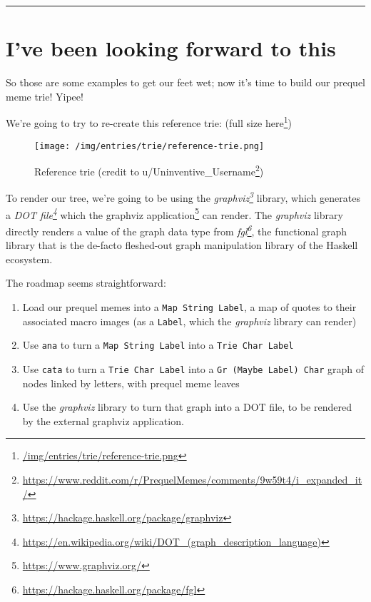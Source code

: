 \documentclass[]{article}
\renewcommand{\href}[2]{#2\footnote{\url{#1}}}
\begin{document}
\begin{center}\rule{0.5\linewidth}{\linethickness}\end{center}

\hypertarget{ive-been-looking-forward-to-this}{%
\section{I've been looking forward to
this}\label{ive-been-looking-forward-to-this}}

So those are some examples to get our feet wet; now it's time to build our
prequel meme trie! Yipee!

We're going to try to re-create this reference trie:
(\href{/img/entries/trie/reference-trie.png}{full size here})

\begin{figure}
\centering
\texttt{[image: /img/entries/trie/reference-trie.png]}
\caption{Reference trie (credit to
\href{https://www.reddit.com/r/PrequelMemes/comments/9w59t4/i_expanded_it/}{u/Uninventive\_Username})}
\end{figure}

To render our tree, we're going to be using the
\emph{\href{https://hackage.haskell.org/package/graphviz}{graphviz}} library,
which generates a
\emph{\href{https://en.wikipedia.org/wiki/DOT_(graph_description_language)}{DOT
file}} which the \href{https://www.graphviz.org/}{graphviz application} can
render. The \emph{graphviz} library directly renders a value of the graph data
type from \emph{\href{https://hackage.haskell.org/package/fgl}{fgl}}, the
functional graph library that is the de-facto fleshed-out graph manipulation
library of the Haskell ecosystem.

The roadmap seems straightforward:

\begin{enumerate}
\def\labelenumi{\arabic{enumi}.}
\tightlist
\item
  Load our prequel memes into a \texttt{Map\ String\ Label}, a map of quotes to
  their associated macro images (as a \texttt{Label}, which the \emph{graphviz}
  library can render)
\item
  Use \texttt{ana} to turn a \texttt{Map\ String\ Label} into a
  \texttt{Trie\ Char\ Label}
\item
  Use \texttt{cata} to turn a \texttt{Trie\ Char\ Label} into a
  \texttt{Gr\ (Maybe\ Label)\ Char} graph of nodes linked by letters, with
  prequel meme leaves
\item
  Use the \emph{graphviz} library to turn that graph into a DOT file, to be
  rendered by the external graphviz application.
\end{enumerate}
\end{document}
